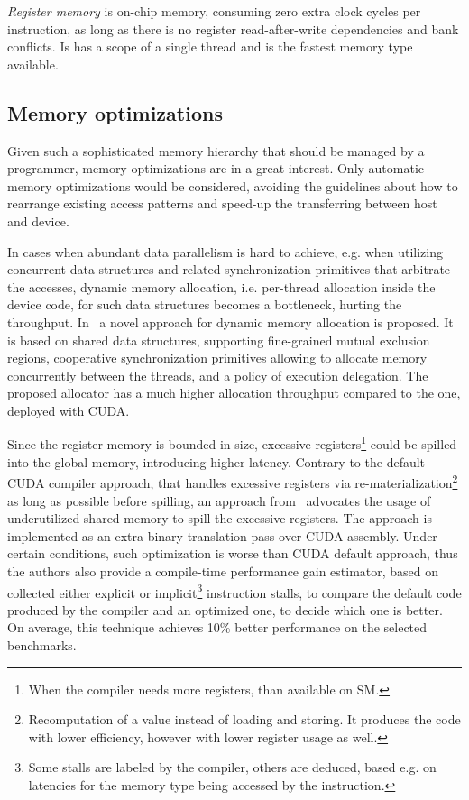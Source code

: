 \emph{Register memory} is on-chip memory, consuming zero extra clock cycles per instruction, as long as there is no register read-after-write dependencies and bank conflicts. Is has a scope of a single thread and is the fastest memory type available.


\subsection{Memory optimizations}
Given such a sophisticated memory hierarchy that should be managed by a programmer, memory optimizations are in a great interest. Only automatic memory optimizations would be considered, avoiding the guidelines about how to rearrange existing access patterns and speed-up the transferring between host and device.

In cases when abundant data parallelism is hard to achieve, e.g. when utilizing concurrent data structures and related synchronization primitives that arbitrate the accesses, dynamic memory allocation, i.e. per-thread allocation inside the device code, for such data structures becomes a bottleneck, hurting the throughput. In~\cite{NvidiaAllocator} a novel approach for dynamic memory allocation is proposed. It is based on shared data structures, supporting fine-grained mutual exclusion regions, cooperative synchronization primitives allowing to allocate memory concurrently between the threads, and a policy of execution delegation. The proposed allocator has a much higher allocation throughput compared to the one, deployed with CUDA.

Since the register memory is bounded in size, excessive registers\footnote{When the compiler needs more registers, than available on SM.} could be spilled into the global memory, introducing higher latency. 
Contrary to the default CUDA compiler approach, that handles excessive registers via re-materialization\footnote{Recomputation of a value instead of loading and storing.
It produces the code with lower efficiency, however with lower register usage as well.} as long as possible before spilling, an approach from~\cite{RegisterSpilling} advocates the usage of underutilized shared memory to spill the excessive registers.
The approach is implemented as an extra binary translation pass over CUDA assembly.
Under certain conditions, such optimization is worse than CUDA default approach, thus the authors also provide a compile-time performance gain estimator, based on collected either explicit or implicit\footnote{Some stalls are labeled by the compiler, others are deduced, based e.g. on latencies for the memory type being accessed by the instruction.} instruction stalls, to compare the default code produced by the compiler and an optimized one, to decide which one is better.
On average, this technique achieves 10\% better performance on the selected benchmarks.

